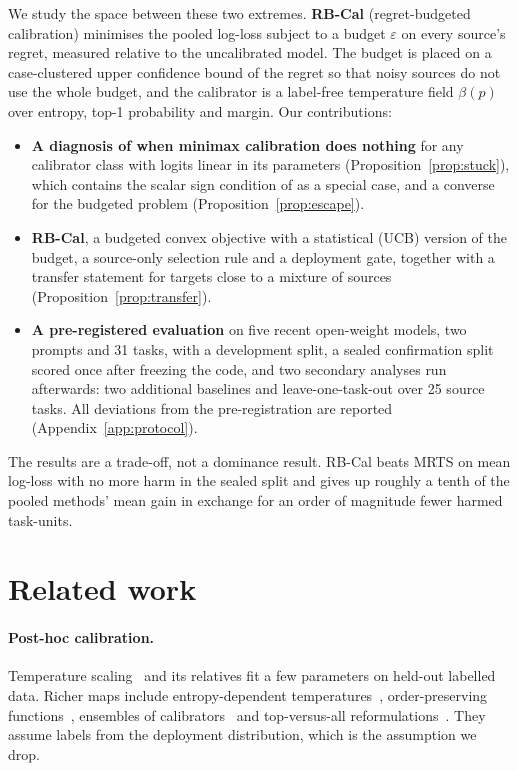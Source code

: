 \documentclass[11pt]{article}
\theoremstyle{remark}
\begin{document}
We study the space between these two extremes.
\textbf{RB-Cal} (regret-budgeted calibration) minimises the pooled log-loss subject to a budget $\varepsilon$ on every source's regret, measured relative to the uncalibrated model.
The budget is placed on a case-clustered upper confidence bound of the regret so that noisy sources do not use the whole budget, and the calibrator is a label-free temperature field $\beta(p)$ over entropy, top-1 probability and margin.
Our contributions:
\begin{itemize}
\item \textbf{A diagnosis of when minimax calibration does nothing} for any calibrator class with logits linear in its parameters (Proposition~\ref{prop:stuck}), which contains the scalar sign condition of \citet{calport2026} as a special case, and a converse for the budgeted problem (Proposition~\ref{prop:escape}).
\item \textbf{RB-Cal}, a budgeted convex objective with a statistical (UCB) version of the budget, a source-only selection rule and a deployment gate, together with a transfer statement for targets close to a mixture of sources (Proposition~\ref{prop:transfer}).
\item \textbf{A pre-registered evaluation} on five recent open-weight models, two prompts and 31 tasks, with a development split, a sealed confirmation split scored once after freezing the code, and two secondary analyses run afterwards: two additional baselines and leave-one-task-out over 25 source tasks.
All deviations from the pre-registration are reported (Appendix~\ref{app:protocol}).
\end{itemize}
The results are a trade-off, not a dominance result.
RB-Cal beats MRTS on mean log-loss with no more harm in the sealed split and gives up roughly a tenth of the pooled methods' mean gain in exchange for an order of magnitude fewer harmed task-units.

\section{Related work}
\paragraph{Post-hoc calibration.}
Temperature scaling~\citep{guo2017calibration} and its relatives fit a few parameters on held-out labelled data.
Richer maps include entropy-dependent temperatures~\citep{balanya2024adaptive}, order-preserving functions~\citep{rahimi2020intra}, ensembles of calibrators~\citep{zhang2020mixnmatch} and top-versus-all reformulations~\citep{lecoz2024tva}.
They assume labels from the deployment distribution, which is the assumption we drop.
\end{document}
